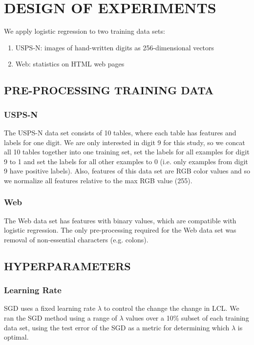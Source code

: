 \section{DESIGN OF EXPERIMENTS}
\label{sec:experiments}

We apply logistic regression to two training data sets:
\begin{enumerate}
    \item USPS-N: images of hand-written digits as 256-dimensional vectors
    \item Web: statistics on HTML web pages
\end{enumerate}


\subsection{PRE-PROCESSING TRAINING DATA}

\subsubsection{USPS-N}
The USPS-N data set consists of 10 tables, where each table has features and labels for one digit. We are only interested in digit 9 for this study, so we concat all 10 tables together into one training set, set the labels for all examples for digit 9 to 1 and set the labels for all other examples to 0 (i.e. only examples from digit 9 have positive labels). Also, features of this data set are RGB color values and so we normalize all features relative to the max RGB value (255).

\subsubsection{Web}
The Web data set has features with binary values, which are compatible with logistic regression. The only pre-processing required for the Web data set was removal of non-essential characters (e.g. colons).


\subsection{HYPERPARAMETERS}

\subsubsection{Learning Rate}
SGD uses a fixed learning rate $\lambda$ to control the change the change in LCL. We ran the SGD method using a range of $\lambda$ values over a 10\% subset of each training data set, using the test error of the SGD as a metric for determining which $\lambda$ is optimal.

